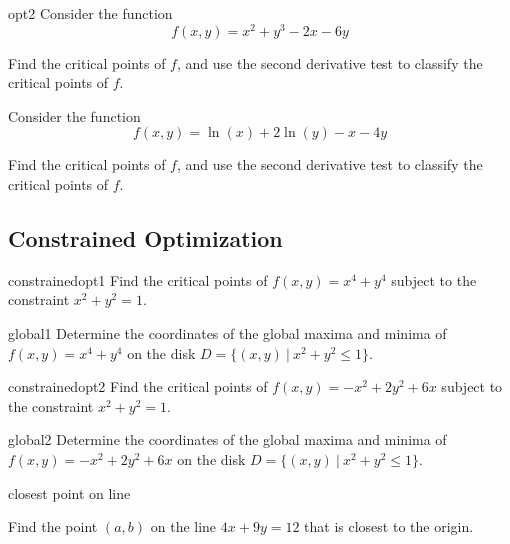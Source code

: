 \begin{problem}{opt2}
    Consider the function $$f(x,y) = x^2 + y^3 - 2x - 6y$$
    
    Find the critical points of $f$, and use the second derivative test to classify the critical points of $f$.
\end{problem}

\begin{problem}
    Consider the function $$f(x,y) = \ln(x) + 2\ln(y) -x - 4y$$
    
    Find the critical points of $f$, and use the second derivative test to classify the critical points of $f$.
\end{problem}

\subsection{Constrained Optimization}

\begin{problem}{constrainedopt1}
    Find the critical points of $f(x,y) = x^4 + y^4$ subject to the constraint $x^2+y^2=1$.  
\end{problem}

\begin{problem}{global1}
    Determine the coordinates of the global maxima and minima of $f(x,y) = x^4 + y^4$ on the disk $D = \{ (x,y) \ | \ x^2 + y^2 \leq 1\}$.
\end{problem}

\begin{problem}{constrainedopt2}
    Find the critical points of $f(x,y) = -x^2+2y^2+6x$ subject to the constraint $x^2+y^2=1$.  
\end{problem}

\begin{problem}{global2}
    Determine the coordinates of the global maxima and minima of $f(x,y) = -x^2+2y^2+6x$ on the disk $D = \{ (x,y) \ | \ x^2 + y^2 \leq 1\}$.
\end{problem}

\begin{problem}{closest point on line}

Find the point $(a,b)$ on the line $4x+9y=12$ that is closest to the origin.
   
\end{problem}